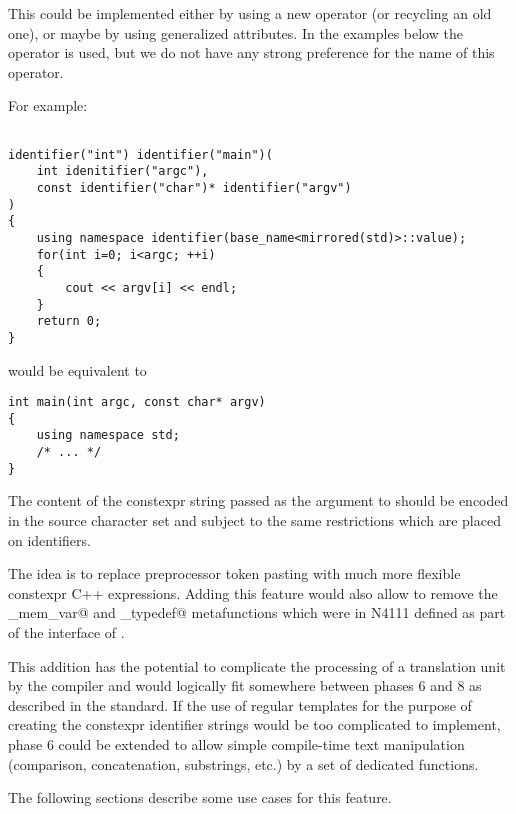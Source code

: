 This could be implemented either by using a new operator (or recycling an old one),
or maybe by using generalized attributes.
In the examples below the \verb@identifier@ operator is used, but we do not have
any strong preference for the name of this operator.

For example:

\begin{verbatim}

identifier("int") identifier("main")(
	int idenitifier("argc"),
	const identifier("char")* identifier("argv")
)
{
	using namespace identifier(base_name<mirrored(std)>::value);
	for(int i=0; i<argc; ++i)
	{
		cout << argv[i] << endl;
	}
	return 0;
}

\end{verbatim}

would be equivalent to

\begin{verbatim}
int main(int argc, const char* argv)
{
	using namespace std;
	/* ... */
}
\end{verbatim}

The content of the constexpr string passed as the argument to \verb@identifier@
should be encoded in the source character set and subject to the same restrictions
which are placed on identifiers.

The idea is to replace preprocessor token pasting with much more flexible constexpr C++ expressions.
Adding this feature would also allow to remove the \verb@named_mem_var@ and
\verb@named_typedef@ metafunctions which were in N4111 defined as part of
the interface of .

This addition has the potential to complicate the processing of a translation unit
by the compiler and would logically fit somewhere between phases 6 and 8 as described
in the standard. If the use of regular templates for the purpose of creating the
constexpr identifier strings would be too complicated to implement, phase 6 could
be extended to allow simple compile-time text manipulation (comparison, concatenation,
substrings, etc.) by a set of dedicated functions.

The following sections describe some use cases for this feature.

